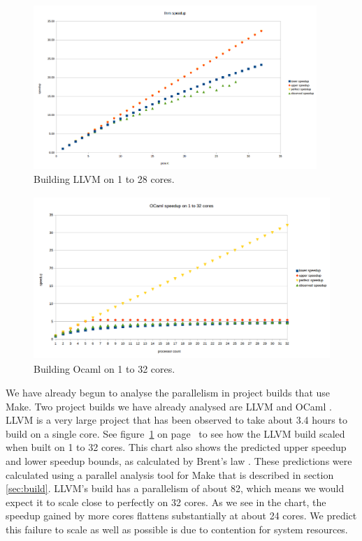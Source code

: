 \documentclass[10pt]{article}
\begin{document}





\begin{figure}[t]
  \centering
  \includegraphics[height=6.2cm]{llvm-speedup-chart.png}
  \caption{Building LLVM on 1 to 28 cores.}\label{fig:llvm}  %
\end{figure}

\begin{figure}[t]
  \centering
  \includegraphics[height=6.2cm]{ocaml-speedup-chart.png}
  \caption{Building Ocaml on 1 to 32 cores.}\label{fig:ocaml}
\end{figure}

We have already begun to analyse the parallelism in project builds that use Make.  Two
project builds we have already analysed are LLVM \cite{llvm} and OCaml \cite{ocaml}.
LLVM is a very large project that has been observed to take about 3.4 hours to build on a
single core.  See figure~\ref{fig:llvm} on page~\pageref{fig:llvm} to see how the LLVM build scaled
when built on 1 to 32 cores.  This chart also shows the predicted upper speedup and lower speedup bounds, as
calculated by Brent's law \cite{brent1974parallel}.  These predictions were calculated using a
parallel analysis tool for Make that is described in section \ref{sec:build}.  LLVM's build has
a parallelism of about 82, which means we would expect it to scale close to perfectly on 32 cores.
As we see in the chart, the speedup gained by more cores flattens substantially at about 24 cores.
We predict this failure to scale as well as possible is due to contention for system resources.
\end{document}
